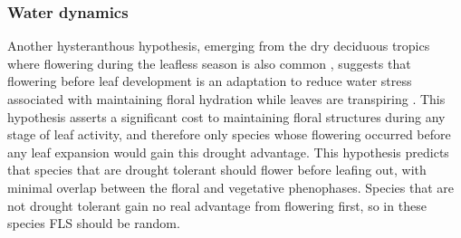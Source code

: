 \documentclass[12pt]{article}\usepackage[]{graphicx}\usepackage[]{color}
\begin{document}
\subsubsection*{Water dynamics}
\indent\indent Another hysteranthous hypothesis, emerging from the dry deciduous tropics where flowering during the leafless season is also common \citep{Janzen1967}, suggests that flowering before leaf development is an adaptation to reduce water stress associated with maintaining floral hydration while leaves are transpiring \citep{Franklin2016}. %
This hypothesis asserts a significant cost to maintaining floral structures during any stage of leaf activity, and therefore only species whose flowering occurred before any leaf expansion would gain this drought advantage. This hypothesis predicts that species that are drought tolerant should flower before leafing out, with minimal overlap between the floral and vegetative phenophases. Species that are not drought tolerant gain no real advantage from flowering first, so in these species FLS should be random. %
\end{document}
